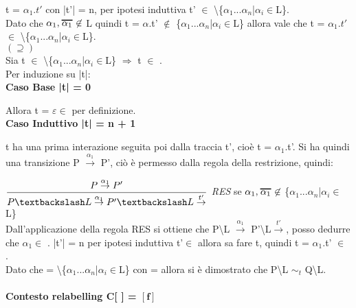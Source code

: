 	t = $\alpha_{1}.t'$ con |t'| = n, per ipotesi induttiva t' $\in$ \textbackslash \{$\alpha_{1}$...$\alpha_{n}$|$\alpha_{i}\in$L\}. \\
	Dato che $\alpha_{1}, \Overline[1pt]{\alpha_{1}} \not\in$ L quindi t = $\alpha$.t' $\not \in$ \{$\alpha_{1}$...$\alpha_{n}$|$\alpha_{i}\in$L\} allora vale che t = $\alpha_{1}.t'$ $\in$ \textbackslash \{$\alpha_{1}$...$\alpha_{n}$|$\alpha_{i}\in$L\}.\\


$(\supseteq)$\\

Sia  t $\in$ \textbackslash\{$\alpha_{1}$...$\alpha_{n}$|$\alpha_{i}\in$L\} $\Rightarrow$ t $\in$ .   \\
Per induzione su |t|:
\\

\textbf{Caso Base |t| = 0}

Allora t = $\varepsilon \in$  per definizione.
\\

\textbf{Caso Induttivo |t| = n + 1}

t ha una prima interazione seguita poi dalla traccia t', cioè t = $\alpha_{1}$.t'. Si ha quindi una transizione P $\overset{\alpha_{1}}\rightarrow$ P', ciò è permesso dalla regola della restrizione, quindi:

$\dfrac{P \overset{\alpha_{1}}\rightarrow P'}{P\textbackslash L \overset{\alpha_{1}}\rightarrow P'\textbackslash L\overset{t'}\rightarrow}$ \textit{RES} se $\alpha_{1}, \Overline[1pt]{\alpha_{1}} \not\in$ \{$\alpha_{1}$...$\alpha_{n}$|$\alpha_{i}\in$L\}\\


Dall'applicazione della regola RES si ottiene che P\textbackslash L $\overset{\alpha_{1}}\rightarrow$ P'\textbackslash L$\overset{t'}\rightarrow$, posso dedurre che $\alpha_{1} \in$ . |t'| = n per ipotesi induttiva t'$\in$  allora  sa fare t, quindi t = $\alpha_{1}$.t' $\in$ .\\

Dato che  = \textbackslash \{$\alpha_{1}$...$\alpha_{n}$|$\alpha_{i}\in$L\} con  =   allora si è dimostrato che  P\textbackslash L $\sim_{t}$ Q\textbackslash L.

\paragraph{Contesto relabelling  C[ ] = $\mathbf{[f]}$ } \mbox{}

